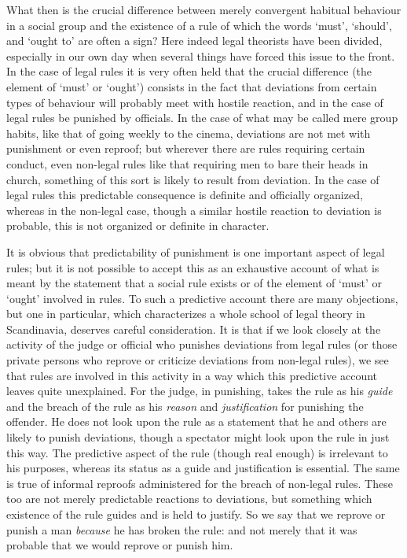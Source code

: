 \documentclass[12pt,oneside]{book}  %
\begin{document}
What then is the crucial difference between merely convergent habitual
behaviour in a social group and the existence of a rule of which the
words `must', `should', and `ought to' are often a sign? Here indeed
legal theorists have been divided, especially in our own day when
several things have forced this issue to the front. In the case of legal
rules it is very often held that the crucial difference (the element of
`must' or `ought') consists in the fact that deviations from certain
types of behaviour will probably meet with hostile reaction, and in the
case of legal rules be punished by officials. In the case of what may be
called mere group habits, like that of going weekly to the cinema,
deviations are not met with punishment or even reproof; but wherever
there are rules requiring certain conduct, even non-legal rules like
that requiring men to bare their heads in church, something of this sort
is likely to result from deviation. In the case of legal rules this
predictable consequence is definite and officially organized, whereas in
the non-legal case, though a similar hostile reaction to deviation is
probable, this is not organized or definite in character.

It is obvious that predictability of punishment is one important aspect
of legal rules; but it is not possible to accept this as an exhaustive
account of what is meant by the statement that a social rule exists or
of the element of `must' or `ought' involved in rules. To such a
predictive account there are many objections, but one in particular,
which characterizes a whole school of legal theory in Scandinavia,
deserves careful consideration. It is that if we look closely at the
activity of the judge or official who punishes deviations from legal
rules (or those private persons who reprove or criticize deviations from
non-legal rules), we see that rules are involved in this activity in a
way which this predictive account leaves quite unexplained. For the
judge, in punishing, takes the rule as his \emph{guide} and the breach
of the rule as his \emph{reason} and \emph{justification} for punishing
the offender. He does not look upon the rule as a statement that he and
others are likely to punish deviations, though a spectator might look
upon the rule in just this way. The predictive aspect of the rule
(though real enough) is irrelevant to his purposes, whereas its status
as a guide and justification is essential. The same is true of informal
reproofs administered for the breach of non-legal rules. These too are
not merely predictable reactions to deviations, but something which
existence of the rule guides and is held to justify. So we say that we
reprove or punish a man \emph{because} he has broken the rule: and not
merely that it was probable that we would reprove or punish him.
\end{document}
